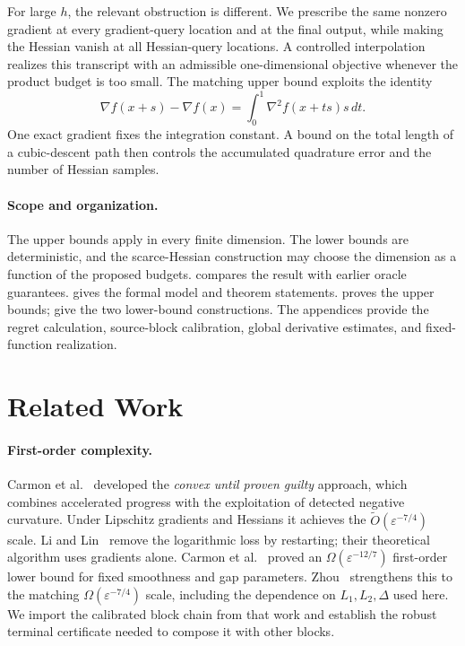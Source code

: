 \documentclass[11pt]{article}
\theoremstyle{remark}
\theoremstyle{remark}
\newcommand{\eps}{\varepsilon}
\begin{document}
For large $h$, the relevant obstruction is different. We prescribe the
same nonzero gradient at every gradient-query location and at the final
output, while making the Hessian vanish at all Hessian-query locations.
A controlled interpolation realizes this transcript with an admissible
one-dimensional objective whenever the product budget is too small.
The matching upper bound exploits the identity
\[
 \nabla f(x+s)-\nabla f(x)
 =\int_0^1\nabla^2f(x+ts)s\,dt.
\]
One exact gradient fixes the integration constant. A bound on the total
length of a cubic-descent path then controls the accumulated quadrature
error and the number of Hessian samples.

\paragraph{Scope and organization.}
The upper bounds apply in every finite dimension. The lower bounds are
deterministic, and the scarce-Hessian construction may choose the
dimension as a function of the proposed budgets.
 compares the result with earlier oracle guarantees.
 gives the formal model and theorem statements.
 proves the upper bounds;
 give the two lower-bound constructions.
The appendices provide the regret calculation, source-block calibration,
global derivative estimates, and fixed-function realization.

\section{Related Work}\label{sec:related}
\paragraph{First-order complexity.}
Carmon et al.~\cite{guilty} developed the \emph{convex until proven guilty}
approach, which combines accelerated progress with the exploitation of
detected negative curvature. Under Lipschitz gradients and Hessians it
achieves the $\widetilde O(\eps^{-7/4})$ scale. Li and Lin~\cite{lilin}
remove the logarithmic loss by restarting; their theoretical algorithm
uses gradients alone. Carmon et al.~\cite{carmon2} proved an
$\Omega(\eps^{-12/7})$ first-order lower bound for fixed smoothness and
gap parameters. Zhou~\cite{zhou} strengthens this to the matching
$\Omega(\eps^{-7/4})$ scale, including the dependence on
$L_1,L_2,\Delta$ used here. We import the calibrated block chain from that
work and establish the robust terminal certificate needed to compose it
with other blocks.
\end{document}
